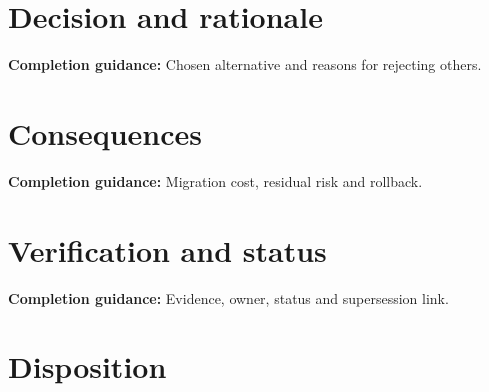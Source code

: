 \documentclass[10pt,letterpaper]{article}
\begin{document}
\section{Decision and rationale}
\textbf{Completion guidance:} Chosen alternative and reasons for rejecting others.\par\medskip{}
\section{Consequences}
\textbf{Completion guidance:} Migration cost, residual risk and rollback.\par\medskip{}
\section{Verification and status}
\textbf{Completion guidance:} Evidence, owner, status and supersession link.\par\medskip{}
\section{Disposition}
\end{document}
